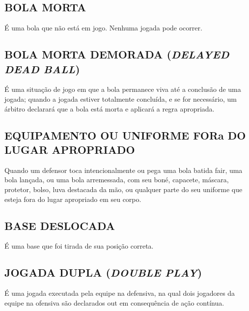 \subsection{BOLA MORTA}
 É uma bola que não está em jogo. Nenhuma jogada pode ocorrer.

\subsection{BOLA MORTA DEMORADA (\textit{DELAYED DEAD BALL})}

 É uma situação de jogo em que a bola permanece viva até a conclusão de uma jogada; quando a jogada estiver totalmente concluída, e se for necessário, um árbitro declarará que a bola está morta e aplicará a regra apropriada.

\subsection{EQUIPAMENTO  OU UNIFORME FORa DO LUGAR APROPRIADO}

Quando um defensor toca intencionalmente ou pega uma bola batida \gls{fair}, uma bola lançada, ou uma bola arremessada, com seu boné, capacete, máscara, protetor, bolso, luva destacada da mão, ou qualquer parte do seu uniforme que esteja fora do lugar apropriado em seu corpo.

\subsection{BASE DESLOCADA}
 É uma base que foi tirada de sua posição correta.
\subsection{JOGADA DUPLA (\textit{DOUBLE PLAY})}
 É uma jogada executada pela equipe na defensiva, na qual dois jogadores da equipe na ofensiva são declarados \gls{out} em consequência de ação contínua.

